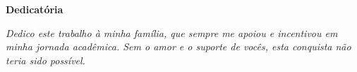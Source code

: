
\begin{center}
		{\LARGE \textbf{Dedicatória}}
	\end{center}
\textit{
Dedico este trabalho à minha família, que sempre me apoiou e incentivou em minha jornada acadêmica. Sem o amor e o suporte de vocês, esta conquista não teria sido possível.  
}